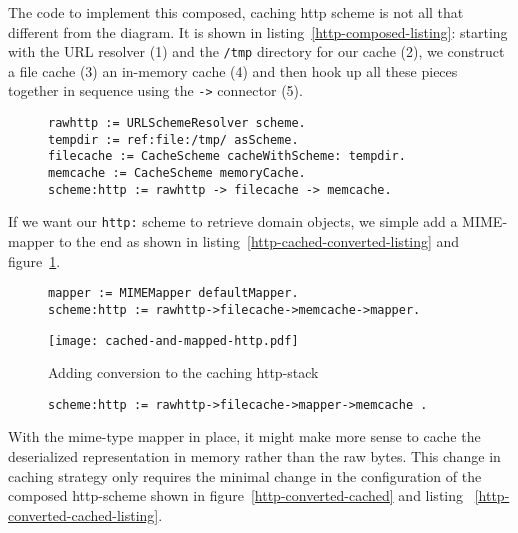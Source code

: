 \documentclass[preprint,authoryear]{acm_proc_article-sp}
\begin{document}
The code to implement this composed, caching http scheme is not all 
that different from the diagram.  It is shown in listing~\ref{http-composed-listing}:  
starting with the URL resolver (1) and the {\tt /tmp} directory for our cache (2), we construct
a file cache (3) an in-memory cache (4) and then hook up all these pieces together
in sequence using the {\tt ->} connector (5).

\begin{figure}[htbp]
\begin{lstlisting}[style=numbers,label=http-composed-listing,caption=Code for caching http stack.]
rawhttp := URLSchemeResolver scheme.
tempdir := ref:file:/tmp/ asScheme.
filecache := CacheScheme cacheWithScheme: tempdir.
memcache := CacheScheme memoryCache.
scheme:http := rawhttp -> filecache -> memcache.
\end{lstlisting}
\end{figure}

If we want our {\tt http:} scheme to retrieve domain objects, we simple add a MIME-mapper
to the end as shown in listing~\ref{http-cached-converted-listing} and figure~\ref{http-cached-converted}.


\begin{figure}[htbp]
\begin{lstlisting}[style=L,label=http-cached-converted-listing,caption=Caching and converting.]
mapper := MIMEMapper defaultMapper.
scheme:http := rawhttp->filecache->memcache->mapper.
\end{lstlisting}
\end{figure}


\begin{figure}[htbp]
\begin{center}
\texttt{[image: cached-and-mapped-http.pdf]}
\caption{Adding conversion to the caching http-stack}
\label{http-cached-converted}
\end{center}
\end{figure}


\begin{figure}[htbp]
\begin{lstlisting}[style=L,label=http-converted-cached-listing,caption=Converting and caching.]
scheme:http := rawhttp->filecache->mapper->memcache .
\end{lstlisting}
\end{figure}


With the mime-type mapper in place, it might make more sense to
cache the deserialized representation in memory rather than
the raw bytes.  This change in caching strategy only requires
the minimal change in the configuration of the composed http-scheme
shown in figure~\ref{http-converted-cached} and listing ~\ref{http-converted-cached-listing}.
\end{document}
